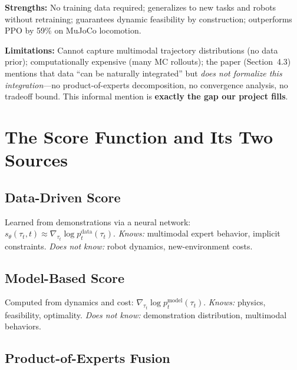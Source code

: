 \documentclass[letterpaper, 10pt, conference]{ieeeconf}
\newcommand{\scoredata}{s_\theta(\tau_t,t)}
\newcommand{\scoremodel}{\nabla_{\tau_t}\log p_t^{\mathrm{model}}(\tau_t)}
\begin{document}
\textbf{Strengths:} No training data required; generalizes to new tasks and
robots without retraining; guarantees dynamic feasibility by construction;
outperforms PPO by 59\% on MuJoCo locomotion.

\textbf{Limitations:} Cannot capture multimodal trajectory distributions (no
data prior); computationally expensive (many MC rollouts); the paper
(Section~4.3) mentions that data ``can be naturally integrated'' but
\emph{does not formalize this integration}---no product-of-experts
decomposition, no convergence analysis, no tradeoff bound.  This informal
mention is \textbf{exactly the gap our project fills}.

\section{The Score Function and Its Two Sources}
\label{sec:scores}

\subsection{Data-Driven Score}

Learned from demonstrations via a neural network:
$\scoredata \approx \nabla_{\tau_t}\log p_t^{\mathrm{data}}(\tau_t).$
\textit{Knows:} multimodal expert behavior, implicit constraints.
\textit{Does not know:} robot dynamics, new-environment costs.

\subsection{Model-Based Score}

Computed from dynamics and cost:
$\scoremodel.$
\textit{Knows:} physics, feasibility, optimality.
\textit{Does not know:} demonstration distribution, multimodal behaviors.

\subsection{Product-of-Experts Fusion}
\end{document}
